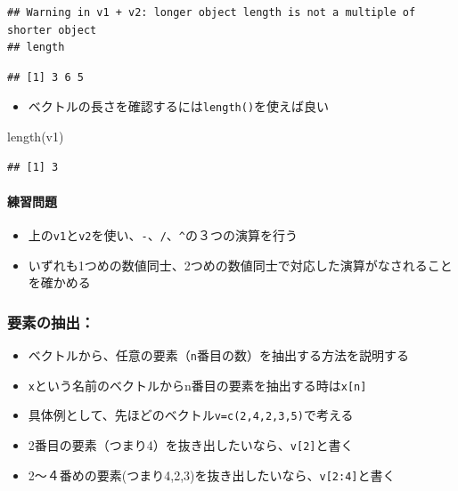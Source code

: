 \documentclass[
]{book}
\newenvironment{Shaded}{\begin{snugshade}}{\end{snugshade}}
\newcommand{\FunctionTok}[1]{\textcolor[rgb]{0.00,0.00,0.00}{#1}}
\newcommand{\NormalTok}[1]{#1}
\providecommand{\tightlist}{%
  \setlength{\itemsep}{0pt}\setlength{\parskip}{0pt}}
\begin{document}
\begin{verbatim}
## Warning in v1 + v2: longer object length is not a multiple of shorter object
## length
\end{verbatim}

\begin{verbatim}
## [1] 3 6 5
\end{verbatim}

\begin{itemize}
\tightlist
\item
  ベクトルの長さを確認するには\texttt{length()}を使えば良い
\end{itemize}

\begin{Shaded}
\begin{Highlighting}[]
\FunctionTok{length}\NormalTok{(v1)}
\end{Highlighting}
\end{Shaded}

\begin{verbatim}
## [1] 3
\end{verbatim}

\hypertarget{ux7df4ux7fd2ux554fux984c-3}{%
\paragraph*{練習問題}\label{ux7df4ux7fd2ux554fux984c-3}}

\begin{itemize}
\tightlist
\item
  上の\texttt{v1}と\texttt{v2}を使い、\texttt{-}、\texttt{/}、\texttt{\^{}}の３つの演算を行う
\item
  いずれも1つめの数値同士、2つめの数値同士で対応した演算がなされることを確かめる
\end{itemize}

\hypertarget{ux8981ux7d20ux306eux62bdux51fa}{%
\subsubsection*{要素の抽出：}\label{ux8981ux7d20ux306eux62bdux51fa}}

\begin{itemize}
\item
  ベクトルから、任意の要素（\texttt{n}番目の数）を抽出する方法を説明する
\item
  \texttt{x}という名前のベクトルからn番目の要素を抽出する時は\texttt{x{[}n{]}}
\item
  具体例として、先ほどのベクトル\texttt{v=c(2,4,2,3,5)}で考える
\item
  2番目の要素（つまり4）を抜き出したいなら、\texttt{v{[}2{]}}と書く
\item
  2〜４番めの要素(つまり4,2,3)を抜き出したいなら、\texttt{v{[}2:4{]}}と書く
\end{itemize}
\end{document}
